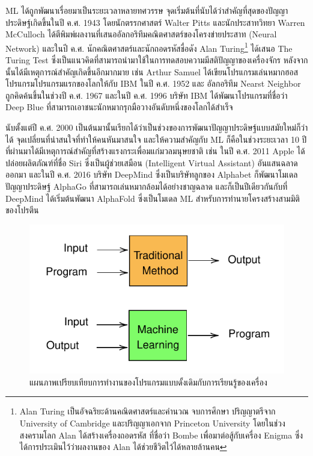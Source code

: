 ML ได้ถูกพัฒนาเรื่อยมาเป็นระยะเวลาหลายทศวรรษ จุดเริ่มต้นที่นับได้ว่าสำคัญที่สุดของปัญญาประดิษฐ์เกิดขึ้นในปี ค.ศ. 1943 โดยนักตรรกศาสตร์
Walter Pitts และนักประสาทวิทยา Warren McCulloch ได้ตีพิมพ์ผลงานที่เสนออัลกอริทึมคณิตศาสตร์ของโครงข่ายประสาท (Neural Network) 
และในปี ค.ศ. นักคณิตศาสตร์และนักถอดรหัสชื่อดัง Alan Turing\footnote{Alan Turing เป็นอัจฉริยะด้านคณิตศาสตร์และคำนวณ จบการศึกษา%
ปริญญาตรีจาก University of Cambridge และปริญญาเอกจาก Princeton University โดยในช่วงสงครามโลก Alan ได้สร้างเครื่องถอดรหัส%
ที่ชื่อว่า Bombe เพื่อมาต่อสู้กับเครื่อง Enigma ซึ่งได้การประเมินไว้ว่าผลงานของ Alan ได้ช่วยชีวิตไว้ได้หลายล้านคน} ได้เสนอ The Turing Test 
ซึ่งเป็นแนวคิดที่สามารถนำมาใช้ในการทดสอบความมีสติปัญญาของเครื่องจักร หลังจากนั้นได้มีเหตุการณ์สำคัญเกิดขึ้นอีกมากมาย เช่น Arthur Samuel 
ได้เขียนโปรแกรมเล่นหมากฮอสโปรแกรมโปรแกรมแรกของโลกให้กับ IBM ในปี ค.ศ. 1952 และ อัลกอริทึม Nearst Neighbor ถูกคิดค้นขึ้นในช่วงปี 
ค.ศ. 1967 และในปี ค.ศ. 1996 บริษัท IBM ได้พัฒนาโปรแกรมที่ชื่อว่า Deep Blue ที่สามารถเอาชนะนักหมากรุกมือวางอันดับหนึ่งของโลกได้สำเร็จ

นับตั้งแต่ปี ค.ศ. 2000 เป็นต้นมานั้นเรียกได้ว่าเป็นช่วงของการพัฒนาปัญญาประดิษฐ์แบบสมัยใหม่ก็ว่าได้ จุดเปลี่ยนที่น่าสนใจที่ทำให้คนหันมาสนใจ%
และให้ความสำคัญกับ ML ก็คือในช่วงระยะเวลา 10 ปีที่ผ่านมาได้มีเหตุการณ์สำคัญที่สร้างแรงกระเพื่อมแก่มวลมนุษยชาติ เช่น ในปี ค.ศ. 2011 
Apple ได้ปล่อยผลิตภัณฑ์ที่ชื่อ Siri ซึ่งเป็นผู้ช่วยเสมือน (Intelligent Virtual Assistant) อันแสนฉลาดออกมา และในปี ค.ศ. 2016 
บริษัท DeepMind ซึ่งเป็นบริษัทลูกของ Alphabet ก็พัฒนาโมเดลปัญญาประดิษฐ์ AlphaGo ที่สามารถเล่นหมากล้อมได้อย่างชาญฉลาด 
และก็เป็นปีเดียวกันกับที่ DeepMind ได้เริ่มต้นพัฒนา AlphaFold ซึ่งเป็นโมเดล ML สำหรับการทำนายโครงสร้างสามมิติของโปรตีน

\begin{figure}[H]
    \centering
    \includegraphics[scale=1]{fig/ML-concept.pdf}
    \caption{แผนภาพเปรียบเทียบการทำงานของโปรแกรมแบบดั้งเดิมกับการเรียนรู้ของเครื่อง}
    \label{fig:ml_paradigm}
\end{figure}

